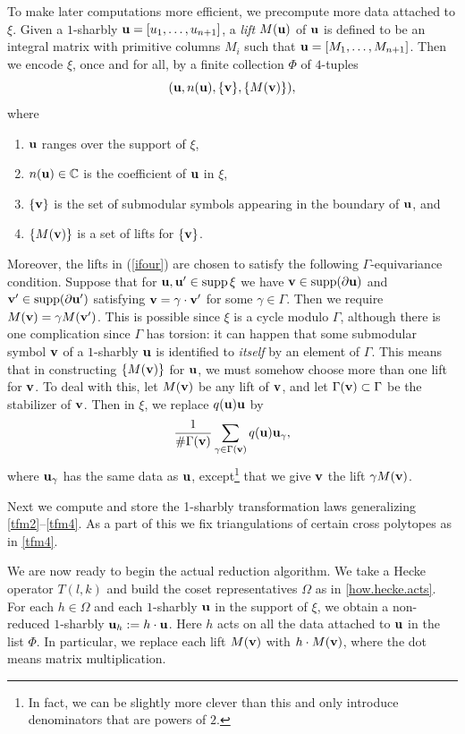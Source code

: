 To make later computations more efficient, we precompute more data
attached to $\xi$.  Given a $1$-sharbly ${\mathbf {u}} = [u_{1},\dotsc
,u_{n+1}]$, a \emph{lift} $M ({\mathbf {u}})$ of ${\mathbf {u}}$ is defined to be an
integral matrix with primitive columns $M_{i}$ such that ${\mathbf {u}} =
[M_{1},\dotsc ,M_{n+1}]$.  Then we encode $\xi $, once and for all, by
a finite collection $\Phi$ of $4$-tuples 
\[
({\mathbf {u}} , n ({\mathbf {u}} ), \{{\mathbf {v}} \}, \{M ({\mathbf {v}}
) \}),
\]
where
\begin{enumerate}
\item ${\mathbf {u}}$ ranges over the support of $\xi$,
\item $n ({\mathbf {u}} )\in \mathbb{C} $ is the coefficient of ${\mathbf {u}}$ in $\xi$,
\item $\{{\mathbf {v}} \}$ is the set of submodular symbols appearing in the
boundary of ${\mathbf {u}}$, and 
\item $\{M ({\mathbf {v}} ) \}$ is a set of lifts for $\{{\mathbf {v}} \}$.\label{ifour}  
\end{enumerate}
Moreover, the lifts in (\ref{ifour}) are chosen to satisfy the
following $\Gamma $-equivariance condition.  Suppose that for ${\mathbf {u}}
,{\mathbf {u}} '\in \operatorname{supp} \xi $ we have ${\mathbf {v}} \in \operatorname{supp} (\partial {\mathbf {u}} ) $
and ${\mathbf {v}} '\in \operatorname{supp} (\partial {\mathbf {u}} ')$ satisfying ${\mathbf {v}} = \gamma
\cdot {\mathbf {v}} '$ for some $\gamma \in \Gamma $.  Then we require $M ({\mathbf {v}}
)= \gamma M ({\mathbf {v}} ')$.  This is possible since $\xi$ is a cycle modulo
$\Gamma$, although there is one complication since $\Gamma$ has torsion:
it can happen that some submodular symbol
${\mathbf {v}}$ of a $1$-sharbly ${\mathbf {u}}$ is identified to \emph{itself} by an
element of $\Gamma$.  
This means that in constructing $\{M ({\mathbf {v}})
\}$ for ${\mathbf {u}}$, we must somehow choose more than one lift for ${\mathbf {v}}$.
To deal with this, let $M
({\mathbf {v}})$ be any lift of ${\mathbf {v}}$, and let $\Gamma ({\mathbf {v}})\subset \Gamma $ be
the stabilizer of ${\mathbf {v}}$.  Then in $\xi$, we replace $q ({\mathbf {u}} ) {\mathbf {u}}$ by
\[
\frac{1}{\#\Gamma ({\mathbf {v}} )}\sum_{\gamma \in \Gamma ({\mathbf {v}})} q ({\mathbf {u}}) {\mathbf {u}}_{\gamma},
\]
where ${\mathbf {u}}_{\gamma }$ has the same data as ${\mathbf {u}}$, 
except\footnote{In fact, we can be slightly
more clever than this and only introduce denominators 
that are powers of $2$.} 
that we give
${\mathbf {v}}$ the lift $\gamma M ({\mathbf {v}})$.


Next we compute and store the 1-sharbly transformation laws generalizing
\eqref{tfm2}--\eqref{tfm4}.  As a part of this we fix triangulations
of certain cross polytopes as in \eqref{tfm4}.  

We are now ready to begin the actual reduction algorithm.  We take a
Hecke operator $T (l,k)$ and build the coset representatives $\Omega $
as in \eqref{how.hecke.acts}.  For each $h\in \Omega $ and each
$1$-sharbly ${\mathbf {u}}$ in the support of $\xi$, we obtain a non-reduced
$1$-sharbly ${\mathbf {u}}_{h} := h\cdot{\mathbf {u}}$.  Here $h$ acts on all the data
attached to ${\mathbf {u}}$ in the list $\Phi$.  In particular, we replace each
lift $M ({\mathbf {v}})$ with $h\cdot M ({\mathbf {v}})$, where the dot means matrix
multiplication.

